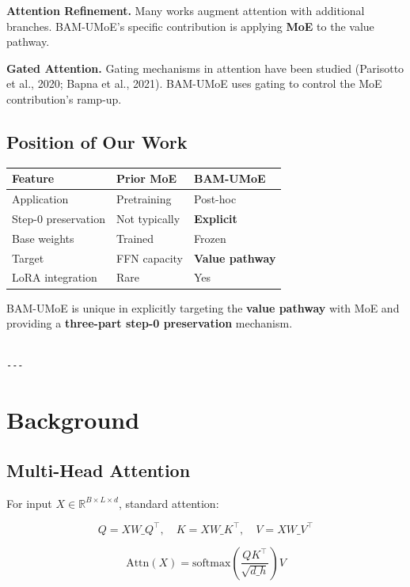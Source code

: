 \textbf{Attention Refinement.} Many works augment attention with additional 
branches. BAM-UMoE's specific contribution is applying \textbf{MoE} to the 
value pathway.

\textbf{Gated Attention.} Gating mechanisms in attention have been studied 
(Parisotto et al., 2020; Bapna et al., 2021). BAM-UMoE uses gating to 
control the MoE contribution's ramp-up.

\subsection{Position of Our Work}

\begin{table}[H]
\centering
\small
\begin{tabular}{lll}
\toprule
\textbf{Feature} & \textbf{Prior MoE} & \textbf{BAM-UMoE} \\
\midrule
Application & Pretraining & Post-hoc \\
Step-0 preservation & Not typically & \textbf{Explicit} \\
Base weights & Trained & Frozen \\
Target & FFN capacity & \textbf{Value pathway} \\
LoRA integration & Rare & Yes \\
\bottomrule
\end{tabular}
\end{table}

BAM-UMoE is unique in explicitly targeting the \textbf{value pathway} with MoE 
and providing a \textbf{three-part step-0 preservation} mechanism.
\begin{lstlisting}

---
\end{lstlisting}

\section{Background}

\subsection{Multi-Head Attention}

For input $X \in \mathbb{R}^{B \times L \times d}$, standard attention:

\[
Q = X W\_Q^\top, \quad K = X W\_K^\top, \quad V = X W\_V^\top
\]

\[
\text{Attn}(X) = \text{softmax}\!\left(\frac{Q K^\top}{\sqrt{d\_h}}\right) V
\]

